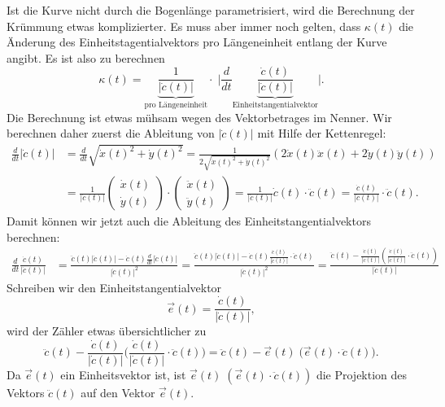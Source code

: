 Ist die Kurve nicht durch die Bogenlänge parametrisiert, wird die
Berechnung der Krümmung etwas komplizierter.
Es muss aber immer noch gelten, dass $\kappa(t)$ die Änderung des
Einheitstagentialvektors pro Längeneinheit entlang der Kurve angibt.
Es ist also zu berechnen
\begin{equation}
\kappa(t)
=
\underbrace{\frac{1}{|\dot c(t)|}}_{\text{pro Längeneinheit}}
\cdot\;
\biggl|\frac{d}{dt}\underbrace{\frac{\dot c(t)}{|\dot c(t)|}}_{\text{Einheitstangentialvektor}}\biggr|.
\label{skript:kruemmung:krallg2}
\end{equation}
Die Berechnung ist etwas mühsam wegen des Vektorbetrages im Nenner.
Wir berechnen daher zuerst die Ableitung von $|\dot c(t)|$ mit
Hilfe der Kettenregel:
\begin{align*}
\frac{d}{dt}|\dot c(t)|
&=
\frac{d}{dt}\sqrt{\dot x(t)^2+\dot y(t)^2}
=
\frac1{2\sqrt{\dot x(t)^2 + \dot y(t)^2}}(2\dot x(t)\ddot x(t) + 2\dot y(t)\ddot y(t))
\\
&=
\frac{1}{|\dot c(t)|}
\begin{pmatrix}\dot x(t)\\\dot y(t)\end{pmatrix}
\cdot
\begin{pmatrix}\ddot x(t)\\\ddot y(t)\end{pmatrix}
=
\frac{1}{|\dot c(t)|}
\dot c(t)\cdot\ddot c(t)
=
\frac{\dot c(t)}{|\dot c(t)|} \cdot\ddot c(t).
\end{align*}
Damit können wir jetzt auch die Ableitung des Einheitstangentialvektors
berechnen:
\begin{align}
\frac{d}{dt} \frac{\dot c(t)}{|\dot c(t)|}
&=
\frac{\displaystyle\ddot c(t) |\dot c(t)| - \dot c(t) \frac{d}{dt}|\dot c(t)|}{|\dot c(t)|^2}
=
\frac{\displaystyle\ddot c(t) |\dot c(t)| - \dot c(t) \frac{\dot c(t)}{|\dot c(t)|}\cdot \ddot c(t)}{|\dot c(t)|^2}
=
\frac{\displaystyle\ddot c(t) - \frac{\dot c(t)}{|\dot c(t)|} \left( \frac{\dot c(t)}{|\dot c(t)|}\cdot \ddot c(t)\right)}{|\dot c(t)|}
\label{skript:kruemmung:krallg1}
\end{align}
Schreiben wir den Einheitstangentialvektor
\[
\vec e(t)= \frac{\dot c(t)}{|\dot c(t)|},
\]
wird der Zähler etwas übersichtlicher zu
\[
\ddot c(t) - \frac{\dot c(t)}{|\dot c(t)|} \biggl( \frac{\dot c(t)}{|\dot c(t)|}\cdot \ddot c(t)\biggr)
=
\ddot c(t) - \vec e(t)\; \bigl(\vec{e}(t)\cdot \ddot c(t)\bigr).
\]
Da $\vec e(t)$ ein Einheitsvektor ist, ist
$\vec e(t) \;(\vec e(t)\cdot\ddot c(t))$ die Projektion des Vektors
$\ddot c(t)$ auf den Vektor $\vec e(t)$.
